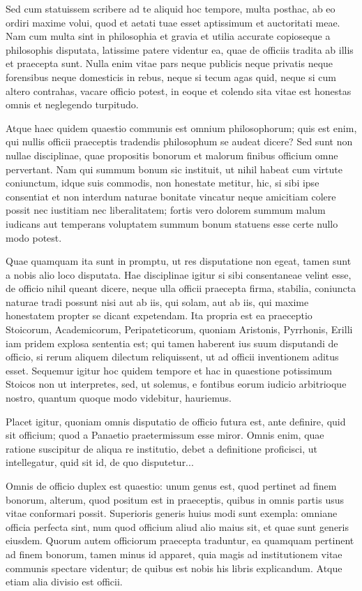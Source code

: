 Sed cum statuissem scribere ad te aliquid hoc tempore, multa posthac, ab eo ordiri maxime volui, quod et aetati tuae esset aptissimum et auctoritati meae. Nam cum multa sint in philosophia et gravia et utilia accurate copioseque a philosophis disputata, latissime patere videntur ea, quae de officiis tradita ab illis et praecepta sunt. Nulla enim vitae pars neque publicis neque privatis neque forensibus neque domesticis in rebus, neque si tecum agas quid, neque si cum altero contrahas, vacare officio potest, in eoque et colendo sita vitae est honestas omnis et neglegendo turpitudo.

 Atque haec quidem quaestio communis est omnium philosophorum; quis est enim, qui nullis officii praeceptis tradendis philosophum se audeat dicere? Sed sunt non nullae disciplinae, quae propositis bonorum et malorum finibus officium omne pervertant. Nam qui summum bonum sic instituit, ut nihil habeat cum virtute coniunctum, idque suis commodis, non honestate metitur, hic, si sibi ipse consentiat et non interdum naturae bonitate vincatur neque amicitiam colere possit nec iustitiam nec liberalitatem; fortis vero dolorem summum malum iudicans aut temperans voluptatem summum bonum statuens esse certe nullo modo potest.
 

 Quae quamquam ita sunt in promptu, ut res disputatione non egeat, tamen sunt a nobis alio loco disputata. Hae disciplinae igitur si sibi consentaneae velint esse, de officio nihil queant dicere, neque ulla officii praecepta firma, stabilia, coniuncta naturae tradi possunt nisi aut ab iis, qui solam, aut ab iis, qui maxime honestatem propter se dicant expetendam. Ita propria est ea praeceptio Stoicorum, Academicorum, Peripateticorum, quoniam Aristonis, Pyrrhonis, Erilli iam pridem explosa sententia est; qui tamen haberent ius suum disputandi de officio, si rerum aliquem dilectum reliquissent, ut ad officii inventionem aditus esset. Sequemur igitur hoc quidem tempore et hac in quaestione potissimum Stoicos non ut interpretes, sed, ut solemus, e fontibus eorum iudicio arbitrioque nostro, quantum quoque modo videbitur, hauriemus.

 

 Placet igitur, quoniam omnis disputatio de officio futura est, ante definire, quid sit officium; quod a Panaetio praetermissum esse miror. Omnis enim, quae ratione suscipitur de aliqua re institutio, debet a definitione proficisci, ut intellegatur, quid sit id, de quo disputetur...

Omnis de officio duplex est quaestio: unum genus est, quod pertinet ad finem bonorum, alterum, quod positum est in praeceptis, quibus in omnis partis usus vitae conformari possit. Superioris generis huius modi sunt exempla: omniane officia perfecta sint, num quod officium aliud alio maius sit, et quae sunt generis eiusdem. Quorum autem officiorum praecepta traduntur, ea quamquam pertinent ad finem bonorum, tamen minus id apparet, quia magis ad institutionem vitae communis spectare videntur; de quibus est nobis his libris explicandum. Atque etiam alia divisio est officii.


